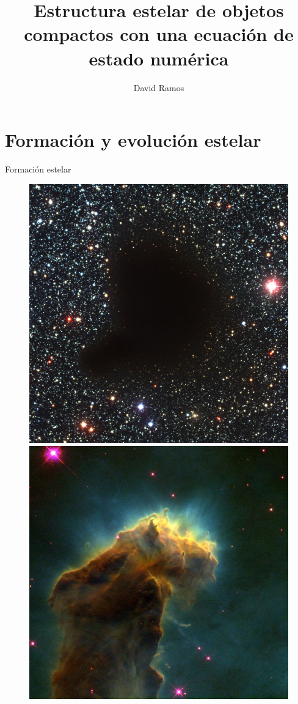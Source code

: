 \documentclass[11pt]{beamer}
\title[Estructura estelar de objetos compactos]{Estructura estelar de objetos compactos con una ecuación de estado numérica}
\author[David Ramos]{David Ramos}
\begin{document}
	\typesetFrontSlides


\section{Formación y evolución estelar}


\begin{frame}{Formación estelar}
    \begin{figure}
    \centering
    \begin{minipage}{.5\textwidth}
        \centering
        \includegraphics[width=.9\linewidth]{barnard.jpg}
    \end{minipage}%
    \begin{minipage}{.5\textwidth}
        \centering
        \includegraphics[width=0.9\linewidth]{eagle.jpg}

\end{minipage}
\end{figure}
\end{frame}
\end{document}
